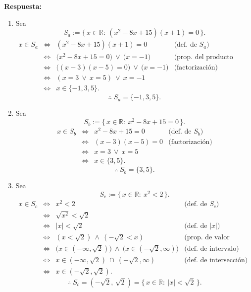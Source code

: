 \documentclass[12pt,letterpaper]{exam}
\begin{document}
\begin{enumerate}
    \textbf{Respuesta:}

\begin{enumerate}[label=\alph*)]

\item
Sea
\[
S_a:=\{\,x\in\mathbb{R}:\ (x^{2}-8x+15)(x+1)=0\,\}.
\]
\[
\begin{array}{rcll}
x\in S_a
&\iff& (x^{2}-8x+15)(x+1)=0 & \text{(def.\ de $S_a$)}\\[2pt]
&\iff& \big(x^{2}-8x+15=0\big)\ \lor\ \big(x=-1\big) & \text{(prop.\ del producto nulo)}\\[2pt]
&\iff& \big((x-3)(x-5)=0\big)\ \lor\ \big(x=-1\big) & \text{(factorización)}\\[2pt]
&\iff& (x=3\ \lor\ x=5)\ \lor\ x=-1 & \\[2pt]
&\iff& x\in\{-1,3,5\}. &
\end{array}
\]
\[
\therefore\; S_a=\{-1,3,5\}.
\]

\item
Sea
\[
S_b:=\{\,x\in\mathbb{R}:\ x^{2}-8x+15=0\,\}.
\]
\[
\begin{array}{rcll}
x\in S_b
&\iff& x^{2}-8x+15=0 & \text{(def.\ de $S_b$)}\\[2pt]
&\iff& (x-3)(x-5)=0 & \text{(factorización)}\\[2pt]
&\iff& x=3\ \lor\ x=5 & \\[2pt]
&\iff& x\in\{3,5\}. &
\end{array}
\]
\[
\therefore\; S_b=\{3,5\}.
\]

\item
Sea
\[
S_c:=\{\,x\in\mathbb{R}:\ x^{2}<2\,\}.
\]
\[
\begin{array}{rcll}
x\in S_c
&\iff& x^{2}<2 & \text{(def.\ de $S_c$)}\\[2pt]
&\iff& \sqrt{x^{2}}<\sqrt{2} & \\[2pt]
&\iff& |x|<\sqrt{2} & \text{(def.\ de $|x|$)}\\[2pt]
&\iff& (x<\sqrt{2})\ \land\ (-\sqrt{2}<x) & \text{(prop.\ de valor absoluto)}\\[2pt]
&\iff& \big(x\in(-\infty,\sqrt{2})\big)\ \land\ \big(x\in(-\sqrt{2},\infty)\big) & \text{(def.\ de intervalo)}\\[2pt]
&\iff& x\in(-\infty,\sqrt{2})\ \cap\ (-\sqrt{2},\infty) & \text{(def.\ de intersección)}\\[2pt]
&\iff& x\in(-\sqrt{2},\sqrt{2}). &
\end{array}
\]
\[
\therefore\; S_c=(-\sqrt{2},\,\sqrt{2})=\{\,x\in\mathbb{R}:\ |x|<\sqrt{2}\,\}.
\]


\end{enumerate}
\end{enumerate}
\end{document}
